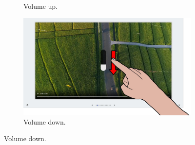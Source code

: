 \begin{figure}[ht]
\begin{subfigure}{.24\textwidth}
        \vspace{-6pt}
        \captionsetup{width=.9\linewidth}
        \caption{Volume up.}
        \label{fig:lui:gestures:volume-up}
    \end{subfigure}
    \begin{subfigure}{.24\textwidth}
        \centering
        \includegraphics[width=.97\linewidth]{Figures/LUI/Gestures/swipe_down-volume.pdf}  
        \vspace{-6pt}
        \captionsetup{width=.9\linewidth}
        \caption{Volume down.}
        \label{fig:lui:gestures:volume-down}
    \end{subfigure}


\end{figure}
